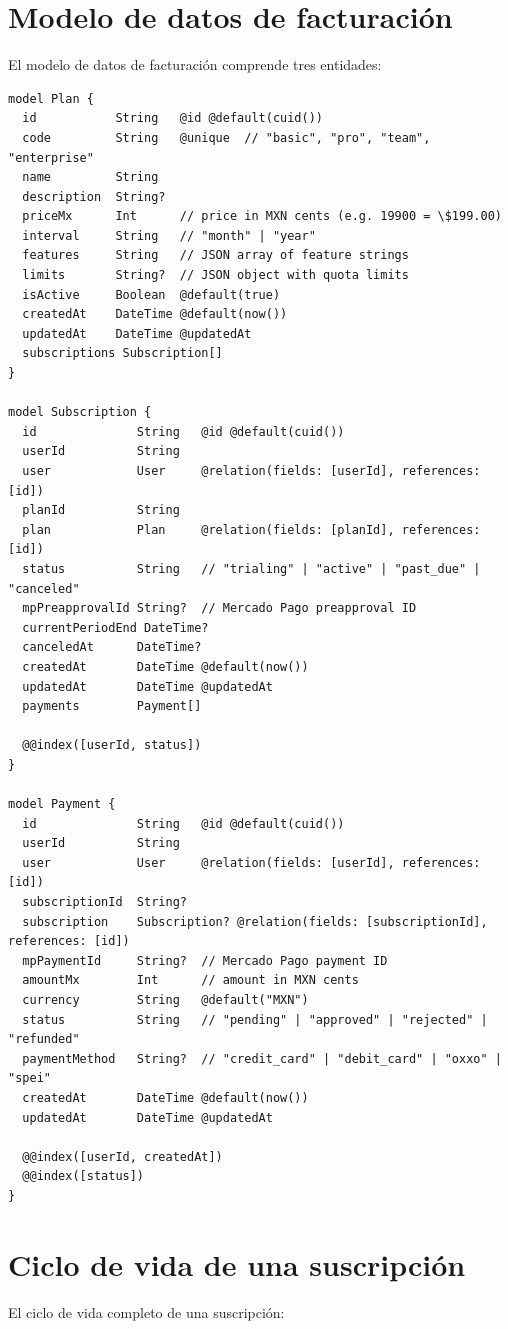 \documentclass[10pt,a4paper,oneside]{report}
\begin{document}
\section{Modelo de datos de facturación}
El modelo de datos de facturación comprende tres entidades:

\begin{lstlisting}[style=sql,caption={Modelos Plan, Subscription, Payment}]
model Plan {
  id           String   @id @default(cuid())
  code         String   @unique  // "basic", "pro", "team", "enterprise"
  name         String
  description  String?
  priceMx      Int      // price in MXN cents (e.g. 19900 = \$199.00)
  interval     String   // "month" | "year"
  features     String   // JSON array of feature strings
  limits       String?  // JSON object with quota limits
  isActive     Boolean  @default(true)
  createdAt    DateTime @default(now())
  updatedAt    DateTime @updatedAt
  subscriptions Subscription[]
}

model Subscription {
  id              String   @id @default(cuid())
  userId          String
  user            User     @relation(fields: [userId], references: [id])
  planId          String
  plan            Plan     @relation(fields: [planId], references: [id])
  status          String   // "trialing" | "active" | "past_due" | "canceled"
  mpPreapprovalId String?  // Mercado Pago preapproval ID
  currentPeriodEnd DateTime?
  canceledAt      DateTime?
  createdAt       DateTime @default(now())
  updatedAt       DateTime @updatedAt
  payments        Payment[]

  @@index([userId, status])
}

model Payment {
  id              String   @id @default(cuid())
  userId          String
  user            User     @relation(fields: [userId], references: [id])
  subscriptionId  String?
  subscription    Subscription? @relation(fields: [subscriptionId], references: [id])
  mpPaymentId     String?  // Mercado Pago payment ID
  amountMx        Int      // amount in MXN cents
  currency        String   @default("MXN")
  status          String   // "pending" | "approved" | "rejected" | "refunded"
  paymentMethod   String?  // "credit_card" | "debit_card" | "oxxo" | "spei"
  createdAt       DateTime @default(now())
  updatedAt       DateTime @updatedAt

  @@index([userId, createdAt])
  @@index([status])
}
\end{lstlisting}

\section{Ciclo de vida de una suscripción}
El ciclo de vida completo de una suscripción:
\end{document}

